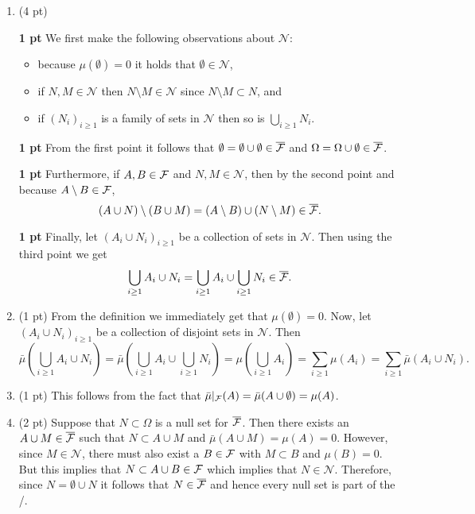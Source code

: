 \begin{enumerate}[label=(\alph*)]
\item (4 pt) 

\textbf{1 pt}
We first make the following observations about $\mathcal{N}$:
\begin{itemize}
\item because $\mu(\emptyset) = 0$ it holds that $\emptyset \in \mathcal{N}$,
\item if $N, M \in \mathcal{N}$ then $N \setminus M \in \mathcal{N}$ since $N \setminus M \subset N$, and
\item if $(N_i)_{i \ge 1}$ is a family of sets in $\mathcal{N}$ then so is $\bigcup_{i \ge 1} N_i$.
\end{itemize}

\textbf{1 pt}
From the first point it follows that $\emptyset = \emptyset \cup \emptyset \in \overline{\mathcal F}$ and $\Omega = \Omega \cup \emptyset \in \overline{\mathcal F}$.

\textbf{1 pt}
Furthermore, if $A, B \in \mathcal F$ and $N, M \in \mathcal{N}$, then by the second point and because $A \setminus B \in \mathcal F$,
\[
	(A \cup N) \setminus (B \cup M) = (A \setminus B) \cup (N \setminus M) \in \overline{\mathcal F}.
\]

\textbf{1 pt}
Finally, let $(A_i \cup N_i)_{i \ge 1}$ be a collection of sets in $\mathcal{N}$. Then using the third point we get
\[
	\bigcup_{i \ge 1} A_i \cup N_i = \bigcup_{i \ge 1} A_i \cup \bigcup_{i \ge 1} N_i \in \overline{\mathcal F}.
\]
\item (1 pt) From the definition we immediately get that $\mu(\emptyset) = 0$. Now, let $(A_i \cup N_i)_{i \ge 1}$ be a collection of disjoint sets in $\mathcal{N}$. Then
\[
	\bar{\mu}(\bigcup_{i \ge 1} A_i \cup N_i) = \bar{\mu}(\bigcup_{i \ge 1} A_i \cup \bigcup_{i \ge 1} N_i)
	= \mu(\bigcup_{i \ge 1} A_i) = \sum_{i \ge 1} \mu(A_i) = \sum_{i \ge 1} \bar{\mu}(A_i \cup N_i).
\]
\item (1 pt)
This follows from the fact that $\bar{\mu}|_{\mathcal F}(A) = \bar{\mu}(A \cup \emptyset) = \mu(A)$.
\item (2 pt)
Suppose that $N \subset \Omega$ is a null set for $\overline{\mathcal F}$. Then there exists an $A \cup M \in \overline{\mathcal F}$ such that $N \subset A \cup M$ and $\bar{\mu}(A \cup M) = \mu(A) = 0$. However, since $M \in \mathcal{N}$, there must also exist a $B \in \mathcal F$ with $M \subset B$ and $\mu(B) = 0$. But this implies that $N \subset A \cup B \in \mathcal F$ which implies that $N \in \mathcal{N}$. Therefore, since $N = \emptyset \cup N$ it follows that $N \in \overline{\mathcal F}$ and hence every null set is part of the \sigalg/.
\end{enumerate}